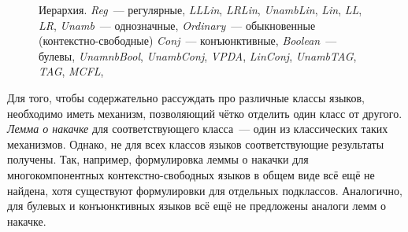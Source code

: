 \begin{figure}[h!]
\begin{center}
{
        }
    \end{center}
    \caption{Иерархия. \emph{Reg}~--- регулярные, \emph{LLLin}, \emph{LRLin}, \emph{UnambLin}, \emph{Lin}, \emph{LL}, \emph{LR}, \emph{Unamb}~--- однозначные, \emph{Ordinary}~--- обыкновенные (контекстно-свободные)
        \emph{Conj}~--- конъюнктивные, \emph{Boolean}~--- булевы, \emph{UnamnbBool}, \emph{UnambConj}, \emph{VPDA}, \emph{LinConj}, \emph{UnambTAG}, \emph{TAG}, \emph{MCFL},}
    \label{fig:hierarchyOkhotin}
\end{figure}

Для того, чтобы содержательно рассуждать про различные классы языков, необходимо иметь механизм, позволяющий чётко отделить один класс от другого.
\emph{Лемма о накачке} для соответствующего класса~--- один из классических таких механизмов.
Однако, не для всех классов языков соответствующие результаты получены.
Так, например, формулировка леммы о накачки для многокомпонентных контекстно-свободных языков в общем виде всё ещё не найдена, хотя существуют формулировки для отдельных подклассов.
Аналогично, для булевых и конъюнктивных языков всё ещё не предложены аналоги лемм о накачке.


